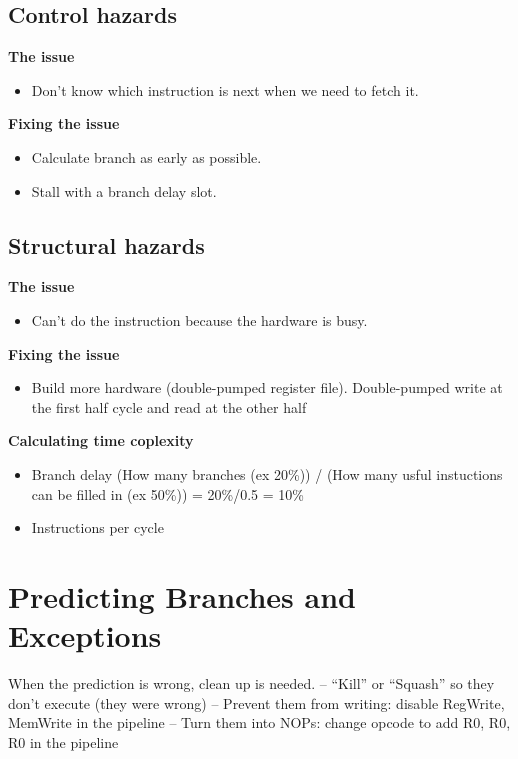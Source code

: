 \subsection{Control hazards}
\textbf{The issue}
\begin{itemize}
\item  Don’t know which instruction is next when we need to fetch it.
\end{itemize}

\textbf{Fixing the issue}
\begin{itemize}
\item  Calculate branch as early as possible.
\item  Stall with a branch delay slot.
\end{itemize}


\subsection{Structural hazards}
\textbf{The issue}
\begin{itemize}
\item  Can’t do the instruction because the hardware is busy.  
\end{itemize}

\textbf{Fixing the issue}
\begin{itemize}
\item  Build more hardware (double-pumped register file).
  Double-pumped write at the first half cycle and read at the other half
\end{itemize}

\textbf{Calculating time coplexity}
\begin{itemize}
\item  Branch delay \newline
  (How many branches (ex 20\%)) / (How many usful instuctions can be filled in (ex 50\%))
  = 20\%/0.5 = 10\%
\item  Instructions per cycle  
\end{itemize}


\newpage


\section{Predicting Branches and Exceptions}
When the prediction is wrong, clean up is needed.
– “Kill” or “Squash” so they don’t execute (they were wrong)
– Prevent them from writing: disable RegWrite, MemWrite in the pipeline
– Turn them into NOPs: change opcode to add R0, R0, R0 in the pipeline


